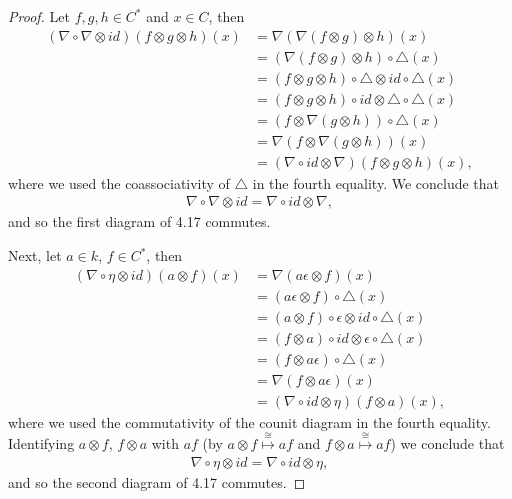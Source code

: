 \documentclass[8pt]{extarticle}
\newcommand{\<}{\langle}
\renewcommand{\>}{\rangle}
\theoremstyle{definition}
\begin{document}
\begin{proof}
  Let $f,g,h \in C^*$ and $x \in C$, then 
  \begin{align*}
    (\nabla \circ \nabla \otimes id)(f \otimes g \otimes h)(x)
    &= \nabla(\nabla(f \otimes g) \otimes h)(x)\\
    &= (\nabla(f \otimes g) \otimes h) \circ \triangle(x)\\
    &= (f \otimes g \otimes h) \circ \triangle \otimes id \circ \triangle(x)\\
    &= (f \otimes g \otimes h) \circ id \otimes \triangle \circ \triangle(x)\\
    &= (f \otimes \nabla(g \otimes h))\circ \triangle(x)\\
    &= \nabla(f \otimes \nabla(g \otimes h))(x) \\
    &= (\nabla\circ id \otimes \nabla)(f \otimes g \otimes h)(x),    
  \end{align*}
  where we used the coassociativity of $\triangle$ in the fourth equality. We conclude that
  \begin{align*}
    \nabla \circ \nabla \otimes id = \nabla\circ id \otimes \nabla,
  \end{align*}
  and so the first diagram of 4.17 commutes.

  Next, let $a \in k$, $f \in C^*$, then
  \begin{align*}
    (\nabla \circ \eta \otimes id)(a \otimes f)(x)
    &=
    \nabla(a \epsilon \otimes f)(x) \\
    &=
    (a \epsilon \otimes f) \circ \triangle (x) \\
    &=
    (a \otimes f)\circ \epsilon \otimes id \circ \triangle (x) \\
    &=
    (f \otimes a) \circ id \otimes \epsilon \circ \triangle (x) \\
    &=
    (f \otimes a \epsilon)  \circ \triangle (x) \\
    &=
    \nabla(f \otimes a \epsilon) (x) \\
    &= (\nabla \circ id \otimes \eta)(f \otimes a) (x),
  \end{align*}
  where we used the commutativity of the counit diagram in the fourth equality. Identifying $a \otimes f$, $f \otimes a$  with $af$ (by $a \otimes f \overset{\cong}{\mapsto} af$ and $f \otimes a \overset{\cong}{\mapsto} af$) we conclude that
  \begin{align*}
    \nabla \circ \eta \otimes id = \nabla \circ id \otimes \eta,
  \end{align*}
  and so the second diagram of 4.17 commutes.
\end{proof}
\end{document}
